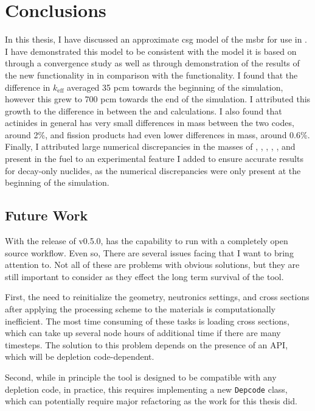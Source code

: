 \chapter{Conclusions}
\label{ch:chapter6}
\glsresetall

In this thesis, I have discussed an approximate \Gls{csg} model of the
\Gls{msbr} for use in \OpenMC. I have demonstrated this model to be consistent
with the \SerpentTWO model it is based on through a convergence study as well as
through demonstration of the results of the new \OpenMC functionality in
\SaltProc in comparison with the \SerpentTWO functionality.
I found that the difference in $k_\text{eff}$ averaged 35 pcm
towards the beginning of the simulation, however this grew to
700 pcm towards the end of the simulation. I attributed this growth
to the difference in  between the \OpenMC and \SerpentTWO
calculations. I also found that actinides in general has very small
differences in mass between the two codes, around 2\%, and fission products
had even lower differences in mass, around 0.6\%. Finally, I attributed
large numerical discrepancies in the masses of , ,
, , , and  present in the fuel
to an experimental \OpenMC feature I added to ensure accurate results for decay-only
nuclides, as the numerical discrepancies were only present at the beginning of the simulation.

\section{Future Work}
With the release of v0.5.0, \SaltProc has the capability to run
with a completely open source workflow. Even so, There are several issues facing \SaltProc
that I want to bring attention to. Not all of these are problems with obvious
solutions, but they are still important to consider as they effect the long
term survival of the tool.

First, the need to reinitialize the geometry, neutronics
settings, and cross sections after applying the processing scheme to the
materials is computationally inefficient. The most time consuming of these tasks
is loading cross sections, which can take up several node hours of additional
time if there are many timesteps. The solution to this problem depends on
the presence of an API, which will be depletion code-dependent.

Second, while in principle the tool is
designed to be compatible with any depletion code, in practice, this requires
implementing a new \verb.Depcode. class, which can potentially require major
refactoring as the work for this thesis did.

